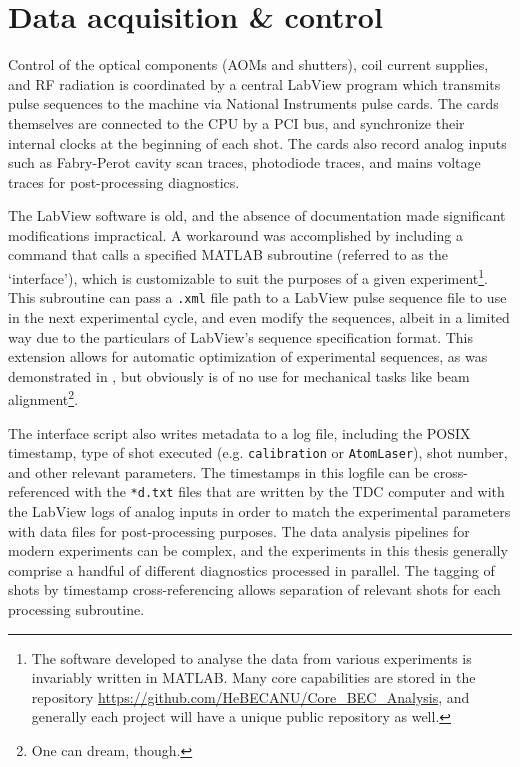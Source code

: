 	


\section{Data acquisition \& control}

	Control of the optical components (AOMs and shutters), coil current supplies, and RF radiation is coordinated by a central LabView program which transmits pulse sequences to the machine via National Instruments pulse cards.
	The cards themselves are connected to the CPU by a PCI bus, and synchronize their internal clocks at the beginning of each shot.
	The cards also record analog inputs such as Fabry-Perot cavity scan traces, photodiode traces, and mains voltage traces for post-processing diagnostics.

	The LabView software is old, and the absence of documentation made significant modifications impractical.
	A workaround was accomplished by including a command that calls a specified MATLAB subroutine (referred to as the `interface'), which is customizable to suit the purposes of a given experiment\footnote{The software developed to analyse the data from various experiments is invariably written in MATLAB.
	Many core capabilities are stored in the repository \url{https://github.com/HeBECANU/Core_BEC_Analysis}, and generally each project will have a unique public repository as well.	}.
	This subroutine can pass a \verb|.xml| file path to a LabView pulse sequence file to use in the next experimental cycle, and even modify the sequences, albeit in a limited way due to the particulars of LabView's sequence specification format.
	This extension allows for automatic optimization of experimental sequences, as was demonstrated in \cite{HensonML}, but obviously is of no use for mechanical tasks like beam alignment\footnote{One can dream, though.}.
	
	The interface script also writes metadata to a log file, including the POSIX timestamp, type of shot executed (e.g.
	\verb|calibration| or \verb|AtomLaser|), shot number, and other relevant parameters.
	The timestamps in this logfile can be cross-referenced with the \verb|*d.txt| files that are written by the TDC computer and with the LabView logs of analog inputs in order to match the experimental parameters with data files for post-processing purposes.
	The data analysis pipelines for modern experiments can be complex, and the experiments in this thesis generally comprise a handful of different diagnostics processed in parallel.
	The tagging of shots by timestamp cross-referencing allows separation of relevant shots for each processing subroutine.
	
